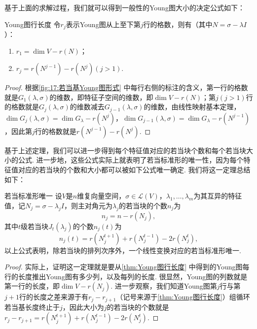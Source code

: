 基于上面的求解过程，我们就可以得到一般性的Young图大小的决定公式如下：
\begin{theorem}{}{Young图行长度}
    令$r_j$表示Young图从上至下第$j$行的格数，则有（其中$N=\sigma-\lambda I$）：
    \begin{enumerate}
        \item $r_1=\dim V-r(N)$；
        \item $r_j=r(N^{j-1})-r(N^j)(j>1)$.
    \end{enumerate}
\end{theorem}
\begin{proof}
    根据\autoref{fig:17:若当基Young图形式} 中每行右侧的标注的含义，第一行的格数就是$G_1(\lambda,\sigma)$的维数，即特征子空间的维数，即$\dim V-r(N)$；第$j(j>1)$行的格数就是$G_j(\lambda,\sigma)$的维数减去$G_{j-1}(\lambda,\sigma)$的维数，由线性映射基本定理，$\dim G_j(\lambda,\sigma)=\dim G_\lambda-r(N^j)$，$\dim G_{j-1}(\lambda,\sigma)=\dim G_\lambda-r(N^{j-1})$，因此第$j$行的格数就是$r(N^{j-1})-r(N^j)$.
\end{proof}

基于上述定理，我们可以进一步得到每个特征值对应的若当块个数和每个若当块大小的公式. 进一步地，这些公式实际上就表明了若当标准形的唯一性，因为每个特征值对应的若当块的个数和大小都可以被如下公式唯一确定. 我们将这一定理总结如下：
\begin{theorem}{}{若当标准形唯一}
    设$V$是$n$维复向量空间，$\sigma\in \mathcal{L}(V)$，$\lambda_1,\ldots,\lambda_m$为其互异的特征值，记$N_j=\sigma-\lambda_j I$，则主对角元为$\lambda_j$的若当块的个数$n_j$为
    \begin{equation} \label{eq:17:若当块个数}
        n_j=n-r(N_j),
    \end{equation}
    其中$t$级若当块$J_t(\lambda_j)$的个数$n_j(t)$为
    \begin{equation} \label{eq:17:若当块大小}
        n_j(t)=r(N_j^{t+1})+r(N_j^{t-1})-2r(N_j^t),
    \end{equation}
    以上公式表明，除若当块的排列次序外，一个线性变换对应的若当标准形唯一.
\end{theorem}
\begin{proof}
    实际上，证明这一定理就是要从\autoref{thm:Young图行长度} 中得到的Young图每行的长度推出Young图有多少列，以及每列的长度. 很显然，Young图的列数就是第一行的长度，即$\dim V-r(N_j)$. 进一步观察，我们知道Young图第$j$行与第$j+1$行的长度之差来源于有$r_j-r_{j+1}$（记号来源于\autoref{thm:Young图行长度}）组循环若当基长度终止于$j$，因此大小为$j$的若当块的个数就是$r_j-r_{j+1}=r(N_j^{t+1})+r(N_j^{t-1})-2r(N_j^t)$.
\end{proof}

